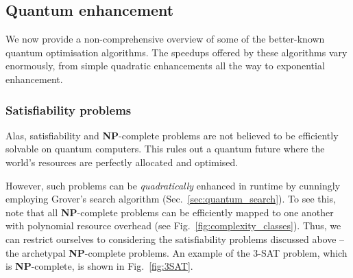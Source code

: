 \subsection{Quantum enhancement}

We now provide a non-comprehensive overview of some of the better-known quantum optimisation algorithms. The speedups offered by these algorithms vary enormously, from simple quadratic enhancements all the way to exponential enhancement.

\subsubsection{Satisfiability problems}



Alas, satisfiability and \textbf{NP}-complete problems are not believed to be efficiently solvable on quantum computers. This rules out a quantum future where the world's resources are perfectly allocated and optimised.

However, such problems can be \textit{quadratically} enhanced in runtime by cunningly employing Grover's search algorithm (Sec.~\ref{sec:quantum_search}). To see this, note that all \textbf{NP}-complete problems can be efficiently mapped to one another with polynomial resource overhead (see Fig.~\ref{fig:complexity_classes}). Thus, we can restrict ourselves to considering the satisfiability problems discussed above -- the archetypal \textbf{NP}-complete problems. An example of the 3-\textsc{SAT} problem, which is \textbf{NP}-complete, is shown in Fig.~\ref{fig:3SAT}.

